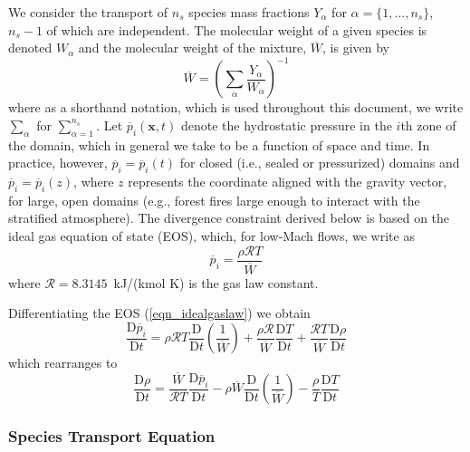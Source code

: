 \documentclass[11pt]{book}
\begin{document}
We consider the transport of $n_s$ species mass fractions $Y_\alpha$ for $\alpha = \{1,\ldots,n_s\}$, $n_s-1$ of which are independent.
The molecular weight of a given species is denoted $W_\alpha$ and the molecular weight of the mixture, $\overline{W}$, is given by
\begin{equation}
\label{eqn_mixmolewt}
\overline{W} = \left( \sum_{\alpha} \frac{Y_\alpha}{W_\alpha} \right)^{-1}
\end{equation}
where as a shorthand notation, which is used throughout this document, we write $\sum_\alpha$ for $\sum_{\alpha = 1}^{n_s}$.
Let $\overline{p}_i(\mathbf{x},t)$ denote the hydrostatic pressure in the $i$th zone of the domain, which in general we take to be a function of space and time.
In practice, however, $\overline{p}_i = \overline{p}_i(t)$ for closed (i.e., sealed or pressurized) domains and $\overline{p}_i = \overline{p}_i(z)$,
where $z$ represents the coordinate aligned with the gravity vector, for large, open domains (e.g., forest fires large enough to interact with the stratified atmosphere).
The divergence constraint derived below is based on the ideal gas equation of state (EOS), which, for low-Mach flows, we write as
\begin{equation}
\label{eqn_idealgaslaw}
\overline{p}_i = \frac{\rho \mathcal{R} T}{\overline{W}}
\end{equation}
where $\mathcal{R} = 8.3145$~kJ/(kmol K) is the gas law constant.

Differentiating the EOS (\ref{eqn_idealgaslaw}) we obtain
\begin{equation}
\label{eqn_DEOS1}
\frac{\mbox{D} \overline{p}_i}{\mbox{D} t} = \rho \mathcal{R} T \frac{\mbox{D}}{\mbox{D} t}\left(\frac{1}{\overline{W}}\right) +
\frac{\rho \mathcal{R}}{\overline{W}} \frac{\mbox{D} T}{\mbox{D} t} + \frac{\mathcal{R}T}{\overline{W}} \frac{\mbox{D} \rho}{\mbox{D} t}
\end{equation}
which rearranges to
\begin{equation}
\label{eqn_DEOS2}
\frac{\mbox{D} \rho}{\mbox{D} t} = \frac{\overline{W}}{\mathcal{R}T} \frac{\mbox{D}\overline{p}_i}{\mbox{D} t} -
\rho \overline{W} \frac{\mbox{D}}{\mbox{D} t}\left(\frac{1}{\overline{W}}\right) - \frac{\rho}{T} \frac{\mbox{D} T}{\mbox{D} t}
\end{equation}


\subsubsection{Species Transport Equation}
\label{species_transport}
\end{document}
